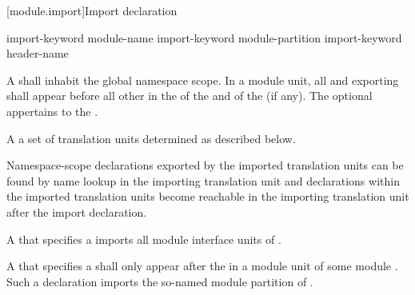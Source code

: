[module.import]{Import declaration}%

\begin{bnf}
\br
    import-keyword module-name  \terminal{;}\br
    import-keyword module-partition  \terminal{;}\br
    import-keyword header-name  \terminal{;}
\end{bnf}

\pnum
A 
shall inhabit the global namespace scope.
In a module unit, all 
and  exporting
shall appear before all other  in
the  of the
and of the  (if any).
The optional 
appertains to the .

\pnum
A   a set of
translation units determined as described below.
\begin{note}
Namespace-scope declarations exported by the imported translation units
can be found by name lookup
in the importing translation unit
and declarations within the imported translation units
become reachable
in the importing translation unit
after the import declaration.
\end{note}

\pnum
A  that specifies
a  
imports all module interface units of .

\pnum
A  that specifies
a  shall only appear after
the  in a module unit of
some module .
Such a declaration imports the so-named
module partition of .

